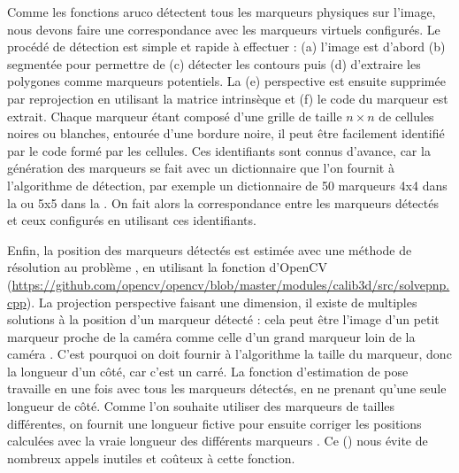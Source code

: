 
Comme les fonctions aruco détectent tous les marqueurs physiques sur l'image, nous devons faire une correspondance avec les marqueurs virtuels configurés. Le procédé de détection est simple et rapide à effectuer  : (a) l'image est d'abord (b) segmentée pour permettre de (c) détecter les contours puis (d) d'extraire les polygones comme marqueurs potentiels. La (e) perspective est ensuite supprimée par reprojection en utilisant la matrice intrinsèque et (f) le code du marqueur est extrait. Chaque marqueur étant composé d'une grille de taille $n \times n$ de cellules noires ou blanches, entourée d'une bordure noire, il peut être facilement identifié par le code formé par les cellules. Ces identifiants sont connus d'avance, car la génération des marqueurs se fait avec un dictionnaire que l'on fournit à l'algorithme de détection, par exemple un dictionnaire de 50 marqueurs 4x4 dans la  ou 5x5 dans la . On fait alors la correspondance entre les marqueurs détectés et ceux configurés en utilisant ces identifiants.


Enfin, la position des marqueurs détectés est estimée avec une méthode de résolution au problème , en utilisant la fonction  d'OpenCV (\url{https://github.com/opencv/opencv/blob/master/modules/calib3d/src/solvepnp.cpp}). La projection perspective faisant  une dimension, il existe de multiples solutions à la position d'un marqueur détecté : cela peut être l'image d'un petit marqueur proche de la caméra comme celle d'un grand marqueur loin de la caméra . C'est pourquoi on doit fournir à l'algorithme la taille du marqueur, donc la longueur d'un côté, car c'est un carré. La fonction d'estimation de pose travaille en une fois avec tous les marqueurs détectés, en ne prenant qu'une seule longueur de côté. Comme l'on souhaite utiliser des marqueurs de tailles différentes, on fournit une longueur fictive pour ensuite corriger les positions calculées avec la vraie longueur des différents marqueurs . Ce  () nous évite de nombreux appels inutiles et coûteux à cette fonction.


